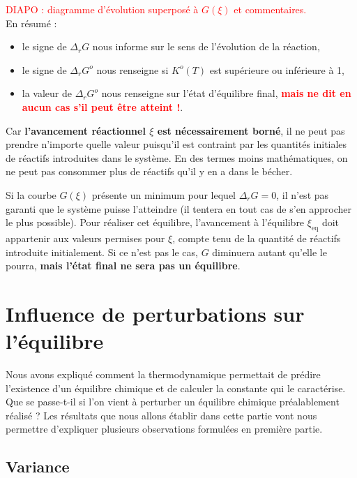 \documentclass[11pt,a4paper]{report}
\begin{document}
\textcolor{red}{DIAPO : diagramme d'évolution superposé à $G(\xi)$ et commentaires.}\\

En résumé :
\begin{itemize}
	\item le signe de $\Delta_r G$ nous informe sur le sens de l'évolution de la réaction,
	\item le signe de $\Delta_r G^o$ nous renseigne si $K^o(T)$ est supérieure ou inférieure à 1,
	\item la valeur de $\Delta_r G^o$ nous renseigne sur l'état d'équilibre final, \textbf{\textcolor{red}{mais ne dit en aucun cas s'il peut être atteint !}}.
\end{itemize}

Car \textbf{l'avancement réactionnel $\xi$ est nécessairement borné}, il ne peut pas prendre n'importe quelle valeur puisqu'il est contraint par les quantités initiales de réactifs introduites dans le système. En des termes moins mathématiques, on ne peut pas consommer plus de réactifs qu'il y en a dans le bécher.

Si la courbe $G(\xi)$ présente un minimum pour lequel $\Delta_r G = 0$, il n'est pas garanti que le système puisse l'atteindre (il tentera en tout cas de s'en approcher le plus possible). Pour réaliser cet équilibre, l'avancement à l'équilibre $\xi_\text{eq}$ doit appartenir aux valeurs permises pour $\xi$, compte tenu de la quantité de réactifs introduite initialement. Si ce n'est pas le cas, $G$ diminuera autant qu'elle le pourra, \textbf{mais l'état final ne sera pas un équilibre}.\\

\section{Influence de perturbations sur l'équilibre}

Nous avons expliqué comment la thermodynamique permettait de prédire l'existence d'un équilibre chimique et de calculer la constante qui le caractérise. Que se passe-t-il si l'on vient à perturber un équilibre chimique préalablement réalisé ? Les résultats que nous allons établir dans cette partie vont nous permettre d'expliquer plusieurs observations formulées en première partie.

\subsection{Variance}
\end{document}
